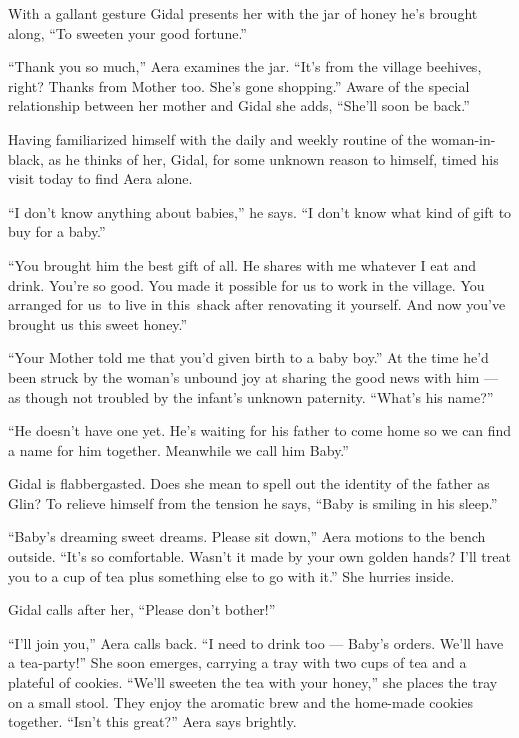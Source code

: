 \documentclass[twoside,11pt,openany]{book}
\begin{document}
With a gallant gesture Gidal presents her with the jar of honey he's brought along, ``To sweeten your good
fortune.''

``Thank you so much,'' Aera examines the jar. ``It's from the village beehives,
right? Thanks from Mother too. She's gone shopping.'' Aware of the special relationship between her mother
and Gidal she adds, ``She'll soon be back.''

Having familiarized himself with the daily and weekly routine of the
woman-in-black, as he thinks of her, Gidal, for
some unknown reason to himself, timed his visit today to find Aera alone.

 ``I don't know anything about babies,'' he says. ``I don't know what kind of
gift to buy for a baby.''

``You brought him the best gift of all. He shares with me whatever I eat and drink. You're so good. You
made it possible{ }for us to work in the village. You arranged for us~to live
in this~shack after renovating it yourself. And now you've brought us this sweet honey.''

``Your Mother told me that you'd given birth to a baby
boy.'' At the time he'd been struck by the woman's unbound joy at sharing the good news with him --- as
though not troubled by the infant's unknown paternity. ``What's his
name?''

``He doesn't have one yet. He's waiting for his father to come home so we can find a name for him together.
Meanwhile we call him Baby.''

Gidal is flabbergasted. Does she mean to spell out the identity of the father as Glin? To relieve himself from the
tension he says, ``Baby is smiling in his sleep.''

``Baby's dreaming sweet dreams. Please sit down,'' Aera motions to the bench
outside. ``It's so comfortable. Wasn't it made by your own
golden hands? I'll treat you to a cup of tea plus something else to go with it.'' She hurries inside.

Gidal calls after her, ``Please don't bother!''

``I'll join you,'' Aera calls back. ``I need to drink too --- Baby's orders. We'll
have a tea-party!'' She soon emerges, carrying a tray with two cups of tea and a plateful of cookies.
``We'll sweeten the tea with your honey,'' she
places the tray on a small stool. They enjoy the aromatic brew and the home-made cookies together. ``Isn't
this great?'' Aera says brightly.
\end{document}
